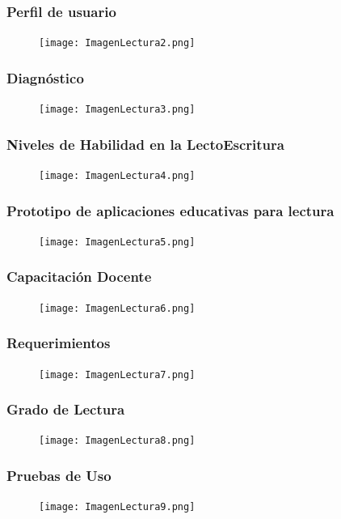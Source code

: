 \documentclass[11pt]{beamer}
\begin{document}
\begin{frame}
\frametitle{Perfil de usuario}
    \begin{figure}
    \centering
     \texttt{[image: ImagenLectura2.png]}
    \end{figure}
\end{frame}

\begin{frame}
\frametitle{Diagnóstico}
    \begin{figure}
    \centering
     \texttt{[image: ImagenLectura3.png]}
    \end{figure}
\end{frame}

\begin{frame}
\frametitle{Niveles de Habilidad en la LectoEscritura}
    \begin{figure}
    \centering
     \texttt{[image: ImagenLectura4.png]}
    \end{figure}
\end{frame}

\begin{frame}
\frametitle{Prototipo de aplicaciones educativas para lectura}
    \begin{figure}
    \centering
     \texttt{[image: ImagenLectura5.png]}
    \end{figure}
\end{frame}

\begin{frame}
\frametitle{Capacitación Docente}
    \begin{figure}
    \centering
     \texttt{[image: ImagenLectura6.png]}
    \end{figure}
\end{frame}

\begin{frame}
\frametitle{Requerimientos}
    \begin{figure}
    \centering
     \texttt{[image: ImagenLectura7.png]}
    \end{figure}
\end{frame}

\begin{frame}
\frametitle{Grado de Lectura}
    \begin{figure}
    \centering
     \texttt{[image: ImagenLectura8.png]}
    \end{figure}
\end{frame}

\begin{frame}
\frametitle{Pruebas de Uso}
    \begin{figure}
    \centering
     \texttt{[image: ImagenLectura9.png]}
    \end{figure}
\end{frame}
\end{document}

